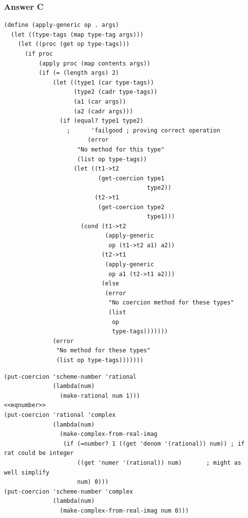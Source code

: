 \documentclass[final,fleqn,titlepage,twoside]{article}
\begin{document}
\subsubsection{Answer C}
\label{sec:orga6f55a9}
\begin{verbatim}
(define (apply-generic op . args)
  (let ((type-tags (map type-tag args)))
    (let ((proc (get op type-tags)))
      (if proc
          (apply proc (map contents args))
          (if (= (length args) 2)
              (let ((type1 (car type-tags))
                    (type2 (cadr type-tags))
                    (a1 (car args))
                    (a2 (cadr args)))
                (if (equal? type1 type2)
                  ;      'failgood ; proving correct operation
                        (error 
                     "No method for this type"
                     (list op type-tags))
                    (let ((t1->t2 
                           (get-coercion type1
                                         type2))
                          (t2->t1 
                           (get-coercion type2 
                                         type1)))
                      (cond (t1->t2
                             (apply-generic 
                              op (t1->t2 a1) a2))
                            (t2->t1
                             (apply-generic 
                              op a1 (t2->t1 a2)))
                            (else
                             (error 
                              "No coercion method for these types"
                              (list 
                               op 
                               type-tags)))))))
              (error 
               "No method for these types"
               (list op type-tags)))))))
\end{verbatim}
\begin{verbatim}
(put-coercion 'scheme-number 'rational
              (lambda(num)
                (make-rational num 1)))
<<eqnumber>>
(put-coercion 'rational 'complex
              (lambda(num)
                (make-complex-from-real-imag
                 (if (=number? 1 ((get 'denom '(rational)) num)) ; if rat could be integer
                     ((get 'numer '(rational)) num)       ; might as well simplify
                     num) 0)))
(put-coercion 'scheme-number 'complex
              (lambda(num)
                (make-complex-from-real-imag num 0)))
\end{verbatim}
\end{document}
